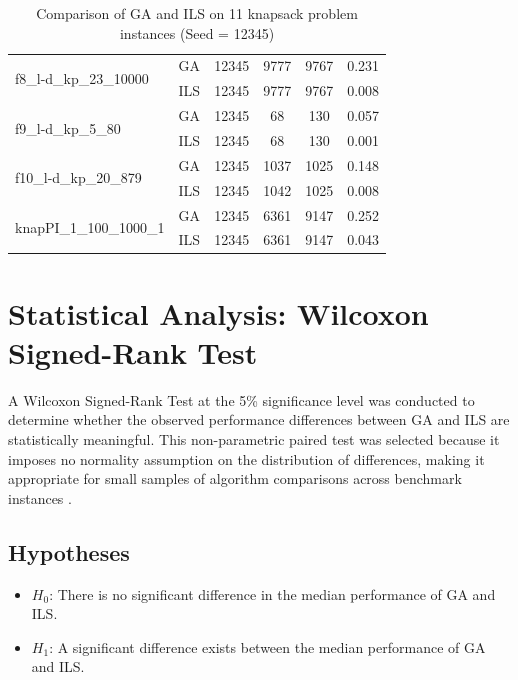 \documentclass[12pt, a4paper]{article}
\begin{document}
\begin{table}[ht]
\begin{tabular}{llcccc}
        \multirow{2}{*}{f8\_l-d\_kp\_23\_10000}
            & GA  & 12345 & 9777 & 9767 & 0.231 \\
            & ILS & 12345 & 9777 & 9767 & 0.008 \\
        \midrule
        \multirow{2}{*}{f9\_l-d\_kp\_5\_80}
            & GA  & 12345 & 68   & 130  & 0.057 \\
            & ILS & 12345 & 68   & 130  & 0.001 \\
        \midrule
        \multirow{2}{*}{f10\_l-d\_kp\_20\_879}
            & GA  & 12345 & 1037 & 1025 & 0.148 \\
            & ILS & 12345 & 1042 & 1025 & 0.008 \\
        \midrule
        \multirow{2}{*}{knapPI\_1\_100\_1000\_1}
            & GA  & 12345 & 6361 & 9147 & 0.252 \\
            & ILS & 12345 & 6361 & 9147 & 0.043 \\
        \bottomrule
    \end{tabular}
    \caption{Comparison of GA and ILS on 11 knapsack problem instances (Seed = 12345)}
    \label{tab:results}
\end{table}

\section{Statistical Analysis: Wilcoxon Signed-Rank Test}

A Wilcoxon Signed-Rank Test at the 5\% significance level was conducted to determine whether the observed performance differences between GA and ILS are statistically meaningful. This non-parametric paired test was selected because it imposes no normality assumption on the distribution of differences, making it appropriate for small samples of algorithm comparisons across benchmark instances \cite{nyathi2025}.

\subsection{Hypotheses}

\begin{itemize}
    \item $H_0$: There is no significant difference in the median performance of GA and ILS.
    \item $H_1$: A significant difference exists between the median performance of GA and ILS.
\end{itemize}
\end{document}
